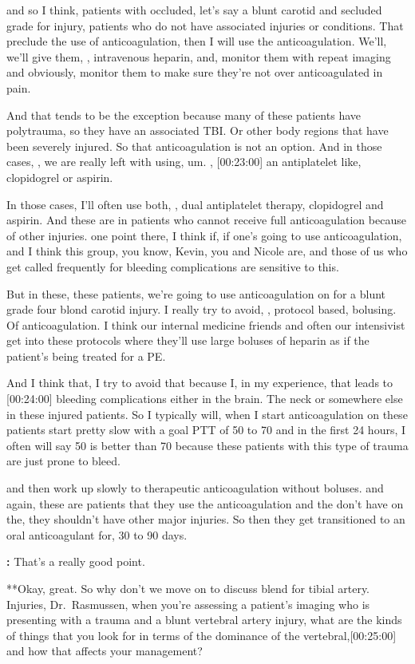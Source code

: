 \documentclass[
]{book}
\begin{document}
and so I think, patients with occluded, let's say a blunt
carotid and secluded grade for injury, patients who do not have
associated injuries or conditions. That preclude the use of
anticoagulation, then I will use the anticoagulation. We'll, we'll give
them, , intravenous heparin, and, monitor them with repeat
imaging and obviously, monitor them to make sure they're not over
anticoagulated in pain.

And that tends to be the exception because many of these patients have
polytrauma, so they have an associated TBI. Or other body regions that
have been severely injured. So that anticoagulation is not an option.
And in those cases, , we are really left with using, um. , {[}00:23:00{]} an
antiplatelet like, clopidogrel or aspirin.

In those cases, I'll often use both, , dual antiplatelet therapy,
clopidogrel and aspirin. And these are in patients who cannot receive
full anticoagulation because of other injuries. one point there, I
think if, if one's going to use anticoagulation, and I think this group,
you know, Kevin, you and Nicole are, and those of us who get called
frequently for bleeding complications are sensitive to this.

But in these, these patients, we're going to use anticoagulation on for
a blunt grade four blond carotid injury. I really try to avoid, ,
protocol based, bolusing. Of anticoagulation. I think our internal
medicine friends and often our intensivist get into these protocols
where they'll use large boluses of heparin as if the patient's being
treated for a PE.

And I think that, I try to avoid that because I, in my experience, that
leads to {[}00:24:00{]} bleeding complications either in the brain. The neck
or somewhere else in these injured patients. So I typically will, when I
start anticoagulation on these patients start pretty slow with a goal
PTT of 50 to 70 and in the first 24 hours, I often will say 50 is better
than 70 because these patients with this type of trauma are just prone
to bleed.

and then work up slowly to therapeutic anticoagulation without
boluses. and again, these are patients that they use the
anticoagulation and the don't have on the, they shouldn't have other
major injuries. So then they get transitioned to an oral anticoagulant
for, 30 to 90 days.

\textbf{:} That's a really
good point.

**Okay, great. So why don't we
move on to discuss blend for tibial artery. Injuries, Dr.~Rasmussen,
when you're assessing a patient's imaging who is presenting with a
trauma and a blunt vertebral artery injury, what are the kinds of things
that you look for in terms of the dominance of the vertebral,{[}00:25:00{]}
and how that affects your management?
\end{document}
